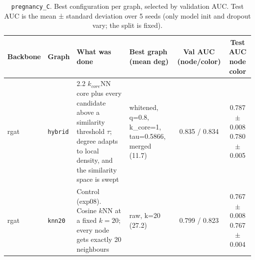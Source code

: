 \begin{table}[t]
\centering
\small
\begin{tabularx}{\textwidth}{llXlcc}
\toprule
Backbone & Graph & What was done & \makecell{Best graph\\(mean deg)} & \makecell{Val AUC\\(node/color)} & \makecell{Test AUC\\node\\color} \\
\midrule
rgat & \texttt{hybrid} & 2.2 $k_{core}$NN core plus every candidate above a similarity threshold $\tau$; degree adapts to local density, and the similarity space is swept & whitened, q=0.8, k\_core=1, tau=0.5866, merged (11.7) & 0.835 / 0.834 & \makecell{0.787 $\pm$ 0.008\\0.780 $\pm$ 0.005} \\
rgat & \texttt{knn20} & Control (exp08). Cosine $k$NN at a fixed $k=20$; every node gets exactly 20 neighbours & raw, k=20 (27.2) & 0.799 / 0.823 & \makecell{0.767 $\pm$ 0.008\\0.767 $\pm$ 0.004} \\
\bottomrule
\end{tabularx}
\caption{\texttt{pregnancy\_C}. Best configuration per graph, selected by validation AUC. Test AUC is the mean ± standard deviation over 5 seeds (only model init and dropout vary; the split is fixed).}
\label{tab:exp10-graph}
\end{table}
